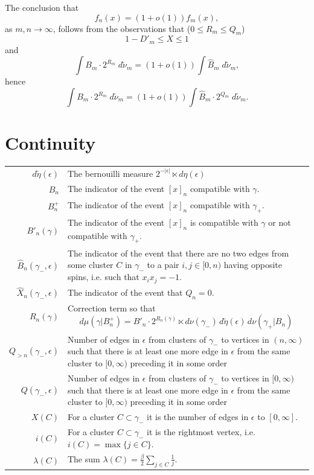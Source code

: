 \documentclass[11pt, a4paper, oneside]{scrartcl}
\theoremstyle{definition}
\theoremstyle{remark}
\renewcommand{\d}{\,d}
\providecommand{\ordo}[1]{{o(#1)}}
\providecommand{\e}{\epsilon}
\providecommand{\g}{\gamma}
\begin{document}
The conclusion that $$f_n(x)=(1+\ordo{1})f_m(x),$$
as $m,n \to \infty$, follows from the observations that ($0\leq R_m \leq Q_m$)
$$1-D'_m\leq X\leq 1$$
and
$$\int B_m \cdot 2^{R_m} \; d\tilde \nu_m =(1+\ordo{1})\int \hat B_m \; d\tilde \nu_m,$$
hence
$$\int B_m \cdot 2^{R_m} \; d\tilde \nu_m =(1+\ordo{1})\int \hat B_m \cdot 2^{Q_m} \; d\tilde \nu_m.$$



\section{Continuity}

\begin{center}
\begin{tabular}{rp{}}
  $d\tilde\eta(\e)$ & The bernouilli measure $2^{-|\e|}\ltimes d\eta(\e)$ \\
  $B_n$  & The indicator of the event $[x]_n$ compatible with $\g$. \\
  $B_n^+$  & The indicator of the event $[x]_n$ compatible with $\g_+$. \\
  $B'_n(\g)$ & The indicator of the event $[x]_n$ is
               compatible with $\g$ or not compatible with $\g_+$. \\
  $\hat B_n(\g_-,\e)$ & The indicator of the event that there are
                   no two edges from some cluster $C$ in $\g_-$
                   to a pair $i,j\in[0,n)$ having opposite spins,
                   i.e. such that $x_i x_j = -1$. \\
  $\hat X_n(\g_-,\e)$ & The indicator of the event that $Q_n=0$. \\
  $R_n(\g)$ & Correction term so that
              $$ d\mu(\g|B^+_n) = B'_n \cdot 2^{R_n(\g)} \ltimes d\nu(\g_-) \d\tilde\eta(\e) \d\nu(\g_+|B_n) $$ \\
  $Q_{>n}(\g_-,\e)$ & Number of edges in $\e$ from clusters of $\g_-$ to vertices in $(n,\infty)$
                      such that there is at least one more edge in $\e$ from the same cluster to $[0,\infty)$
                      preceding it in some order\\
  $Q(\g_-,\e)$ & Number of edges in $\e$ from clusters of $\g_-$ to vertices in $[0,\infty)$
                 such that there is at least one more edge in $\e$ from the same cluster to $[0,\infty)$
                 preceding it in some order\\
  $X(C)$ & For a cluster $C\subset \g_{-}$ it is the number of edges in $\e$ to $[0,\infty]$. \\
  $i(C)$ & For a cluster $C\subset \g_{-}$ it is the rightmost vertex, i.e.\ $i(C)=\max \{j\in C\}$. \\
  $\lambda(C)$ & The sum $\lambda(C) = \frac{\beta}{2} \sum_{j\in C} \frac 1j$. \\
\end{tabular}
\end{center}
\end{document}
